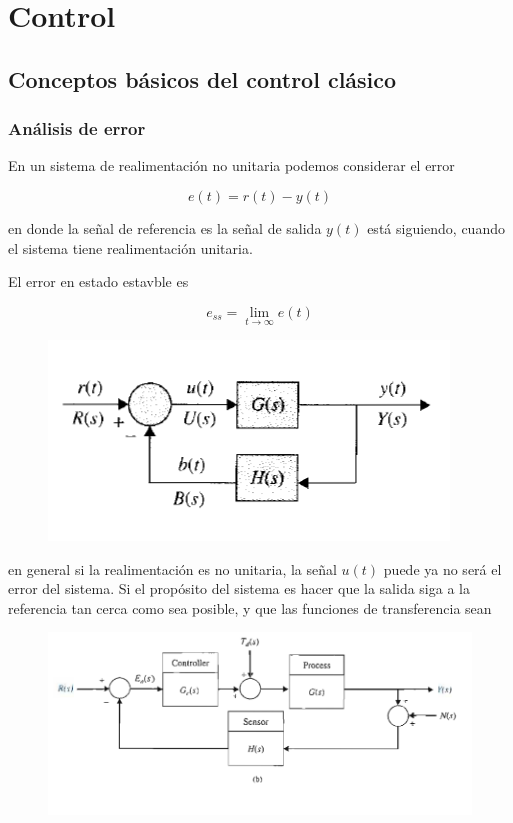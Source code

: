 \chapter{Control}

\section{Conceptos básicos del control clásico}

\subsection{Análisis de error}


En un sistema de realimentación no unitaria podemos considerar el error 

\begin{equation*}
e(t) = r(t) - y(t)
\end{equation*}

en donde la señal de referencia es la señal de salida $y(t)$ está siguiendo, cuando el sistema tiene realimentación unitaria.

El error en estado estavble es

\begin{equation*}
e_{ss} = \lim_{t \to \infty} e(t)
\end{equation*}


\begin{figure}[H]
    \centering
    \includegraphics{Control/control_errorf2.png}
\end{figure}

en general si la realimentación es no unitaria, la señal $u(t)$ puede ya no será el error del sistema. Si el propósito del sistema es hacer que la salida siga a la referencia tan cerca como sea posible, y que las funciones de transferencia sean 




\begin{figure}[H]
    \centering
    \includegraphics[scale=0.5]{Control/control_errorf1.png}
\end{figure}


